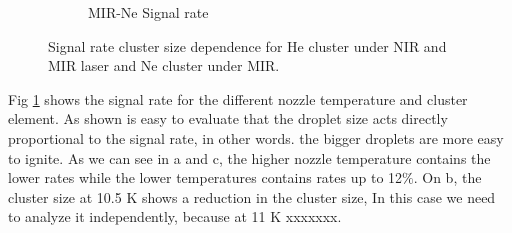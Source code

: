 \begin{figure}[h!]
\begin{subfigure}[l]{0.32\textwidth}
\caption{MIR-Ne Signal rate} \end{subfigure}
\caption[Cluster size-signal rate]{Signal rate cluster size dependence for He cluster under NIR and MIR laser and Ne cluster under MIR.}
\label{fig:CompSigRate}
\end{figure}

Fig \ref{fig:CompSigRate} shows the signal rate for the different nozzle temperature and cluster element. As shown is easy to evaluate that the droplet size acts directly proportional to the signal rate, in other words. the bigger droplets  are more easy to ignite. As we can see in a and c, the higher nozzle temperature contains the lower rates while the lower temperatures contains rates up to 12$\%$. On b, the cluster size at 10.5 K shows a reduction in the cluster size, In this case we need to analyze it independently, because at 11 K xxxxxxx.

